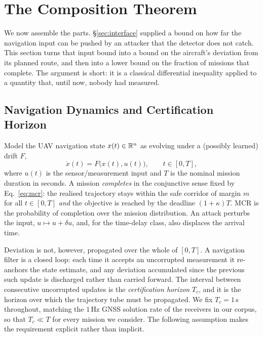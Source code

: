 \section{The Composition Theorem}
\label{sec:theorem}
We now assemble the parts. \S\ref{sec:interface} supplied a bound on how far the
navigation input can be pushed by an attacker that the detector does not catch.
This section turns that input bound into a bound on the aircraft's deviation
from its planned route, and then into a lower bound on the fraction of missions
that complete. The argument is short: it is a classical differential inequality
applied to a quantity that, until now, nobody had measured.

\subsection{Navigation Dynamics and Certification Horizon}
Model the UAV navigation state $x(t)\in\mathbb{R}^n$ as evolving under a (possibly
learned) drift $F$,
\begin{equation}
\label{eq:ode}
\dot{x}(t) = F\big(x(t), u(t)\big), \qquad t\in[0,T],
\end{equation}
where $u(t)$ is the sensor/measurement input and $T$ is the nominal mission
duration in seconds. A mission \emph{completes} in the conjunctive sense fixed
by Eq.~\eqref{eq:mcr}: the realised trajectory stays within the safe corridor of
margin $m$ for all $t\in[0,T]$ \emph{and} the objective is reached by the
deadline $(1+\kappa)T$. MCR is the probability of completion over the mission
distribution. An attack perturbs the input, $u\mapsto u+\delta u$, and, for the
time-delay class, also displaces the arrival time.

Deviation is not, however, propagated over the whole of $[0,T]$. A navigation
filter is a closed loop: each time it accepts an uncorrupted measurement it
re-anchors the state estimate, and any deviation accumulated since the previous
such update is discharged rather than carried forward. The interval between
consecutive uncorrupted updates is the \emph{certification horizon} $T_c$, and
it is the horizon over which the trajectory tube must be propagated. We fix
$T_c=1$\,s throughout, matching the $1$\,Hz GNSS solution rate of the receivers
in our corpus, so that $T_c\ll T$ for every mission we consider. The following
assumption makes the requirement explicit rather than implicit.

